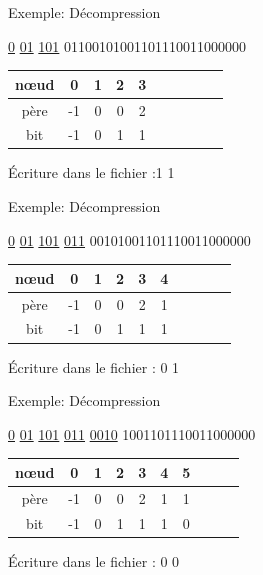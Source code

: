 \documentclass[french]{beamer}
\begin{document}
\begin{frame}{Exemple: Décompression}
\begin{center}
\underline{0} \underline{01} \underline{101} 01100101001101110011000000
\end{center}

	\begin{center}
	\begin{tabular}{|c|c|c|c|c|c|c|c|c|c|}
	\hline
	nœud & 0 & 1 & 2 & 3 \\
	\hline
	père & -1 & 0 & 0 & 2\\
	\hline
	bit & -1 & 0 & 1 & 1 \\
	\hline 
	\end{tabular}
	\end{center}
	\begin{center}
	Écriture dans le fichier :1 1
	\end{center}
\end{frame}

\begin{frame}{Exemple: Décompression}
\begin{center}
\underline{0} \underline{01} \underline{101} \underline{011} 00101001101110011000000
\end{center}

	\begin{center}
	\begin{tabular}{|c|c|c|c|c|c|c|c|c|c|}
	\hline
	nœud & 0 & 1 & 2 & 3 & 4 \\
	\hline
	père & -1 & 0 & 0 & 2 & 1 \\
	\hline
	bit & -1 & 0 & 1 & 1 & 1 \\
	\hline 
	\end{tabular}
	\end{center}
	\begin{center}
	Écriture dans le fichier : 0 1
	\end{center}
\end{frame}

\begin{frame}{Exemple: Décompression}
\begin{center}
\underline{0} \underline{01} \underline{101} \underline{011} \underline{0010} 1001101110011000000
\end{center}

	\begin{center}
	\begin{tabular}{|c|c|c|c|c|c|c|c|c|c|}
	\hline
	nœud & 0 & 1 & 2 & 3 & 4 & 5 \\
	\hline
	père & -1 & 0 & 0 & 2 & 1 & 1  \\
	\hline
	bit & -1 & 0 & 1 & 1 & 1 & 0 \\
	\hline 
	\end{tabular}
	\end{center}
	\begin{center}
	Écriture dans le fichier : 0 0
	\end{center}
\end{frame}
\end{document}
